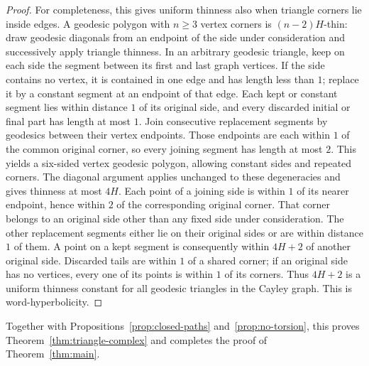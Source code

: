 \begin{proof}
For completeness, this gives uniform thinness also when triangle
corners lie inside edges. A geodesic polygon with $n\ge3$ vertex
corners is $(n-2)H$-thin: draw geodesic diagonals from an endpoint of
the side under consideration and successively apply triangle thinness.
In an arbitrary geodesic triangle, keep on each side the segment
between its first and last graph vertices. If the side contains no
vertex, it is contained in one edge and has length less than $1$;
replace it by a constant segment at an endpoint of that edge.
Each kept or constant segment lies within distance $1$ of its original
side, and every discarded initial or final part has length at most
$1$. Join consecutive replacement segments by geodesics between their
vertex endpoints. Those endpoints are each within $1$ of the common
original corner, so every joining segment has length at most $2$.
This yields a six-sided vertex geodesic polygon, allowing constant
sides and repeated corners. The diagonal argument applies unchanged
to these degeneracies and gives thinness at most $4H$.
Each point of a joining side is within $1$ of its nearer endpoint,
hence within $2$ of the corresponding original corner. That corner
belongs to an original side other than any fixed side under
consideration. The other replacement segments either lie on their
original sides or are within distance $1$ of them. A point on a kept
segment is consequently within $4H+2$ of another original side.
Discarded tails are within $1$ of a shared corner; if an original side
has no vertices, every one of its points is within $1$ of its corners.
Thus $4H+2$ is a uniform thinness constant for all geodesic triangles
in the Cayley graph. This is word-hyperbolicity.
\end{proof}

Together with Propositions~\ref{prop:closed-paths} and~\ref{prop:no-torsion},
this proves Theorem~\ref{thm:triangle-complex} and completes the proof of
Theorem~\ref{thm:main}.
